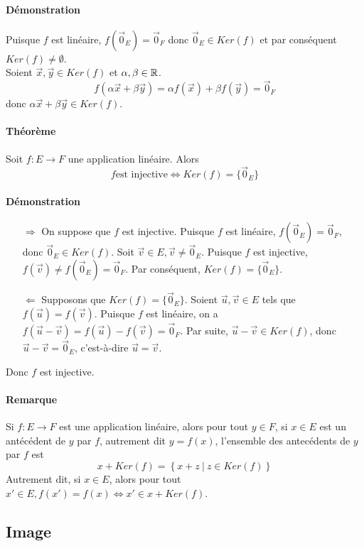 \paragraph{Démonstration} Puisque $f$ est linéaire, $f(\vec{0}_E) = \vec{0}_F$ donc $\vec{0}_E \in Ker(f)$ et par conséquent $Ker(f) \neq \emptyset$. \\
Soient $\vec{x}, \vec{y} \in Ker(f)$ et $\alpha, \beta \in \mathbb{R}$.
$$f(\alpha \vec{x} + \beta \vec{y}) = \alpha f(\vec{x}) + \beta f(\vec{y}) = \vec{0}_F$$
donc $\alpha \vec{x} + \beta \vec{y} \in Ker(f)$.

\paragraph{Théorème} Soit $f: E \rightarrow F$ une application linéaire. Alors
$$f \text{est injective} \Leftrightarrow Ker(f) = \{\vec{0}_E\}$$
\paragraph{Démonstration} 
\begin{itemize}
  \item[$\Rightarrow$] On suppose que $f$ est injective. Puisque $f$ est linéaire, $f(\vec{0}_E) = \vec{0}_F$, donc $\vec{0}_E \in Ker(f)$. Soit $\vec{v} \in E, \vec{v}\neq \vec{0}_E$. Puisque $f$ est injective, $f(\vec{v}) \neq f(\vec{0}_E) = \vec{0}_F$. Par conséquent, $Ker(f) = \{\vec{0}_E\}$.
  \item[$\Leftarrow$] Supposons que $Ker(f) = \{\vec{0}_E\}$. Soient $\vec{u}, \vec{v} \in E$ tels que $f(\vec{u}) = f(\vec{v})$. Puisque $f$ est linéaire, on a $f(\vec{u} - \vec{v}) = f(\vec{u}) - f(\vec{v}) = \vec{0}_F$. Par suite, $\vec{u} - \vec{v} \in Ker(f)$, donc $\vec{u}-\vec{v} = \vec{0}_E$, c'est-à-dire $\vec{u} = \vec{v}$.
\end{itemize}
Donc $f$ est injective.

\paragraph{Remarque} Si $f: E \rightarrow F$ est une application linéaire, alors pour tout $y \in F$, si $x \in E$ est un antécédent de $y$ par $f$, autrement dit $y = f(x)$, l'ensemble des antecédents de $y$ par $f$ est
$$x + Ker(f) = \left\{ x+z ~ \vert ~ z \in Ker(f) \right\}$$
Autrement dit, si $x \in E$, alors pour tout $x' \in E, f(x') = f(x) \Leftrightarrow x' \in x + Ker(f)$.

%
\subsection{Image}
%
